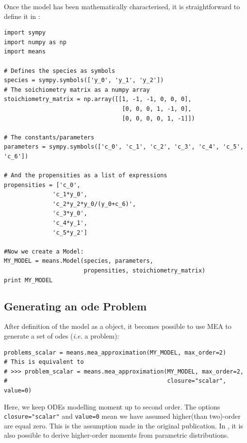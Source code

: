 Once the model has been mathematically characterised, it is straightforward to define it in \means:


\begin{framed}
\begin{verbatim}
import sympy
import numpy as np
import means

# Defines the species as symbols
species = sympy.symbols(['y_0', 'y_1', 'y_2'])
# The soichiometry matrix as a numpy array
stoichiometry_matrix = np.array([[1, -1, -1, 0, 0, 0],
                                  [0, 0, 0, 1, -1, 0],
                                  [0, 0, 0, 0, 1, -1]])

# The constants/parameters
parameters = sympy.symbols(['c_0', 'c_1', 'c_2', 'c_3', 'c_4', 'c_5', 'c_6'])

# And the propensities as a list of expressions
propensities = ['c_0',
              'c_1*y_0',
              'c_2*y_2*y_0/(y_0+c_6)',
              'c_3*y_0',
              'c_4*y_1',
              'c_5*y_2']

#Now we create a Model:
MY_MODEL = means.Model(species, parameters,
                       propensities, stoichiometry_matrix)
print MY_MODEL
\end{verbatim}
\end{framed}

\subsection{Generating an \gls{ode} Problem}
\label{sec:approximation-example}
After definition of the model as a \py{} object, it becomes possible to use MEA to generate a set of \gls{ode}s (\emph{i.e.} a problem):


\begin{framed}
\begin{verbatim}
problems_scalar = means.mea_approximation(MY_MODEL, max_order=2)
# This is equivalent to
# >>> problem_scalar = means.mea_approximation(MY_MODEL, max_order=2,
#                                              closure="scalar", value=0)
\end{verbatim}
\end{framed}
Here, we keep ODEs modelling moment up to second order. The options \texttt{closure="scalar"} and \texttt{value=0} mean we have assumed higher(than two)-order are equal zero.
This is the assumption made in the original publication\cite{ale_general_2013}. In \means, it is also possible to derive higher-order moments from parametric distributions.

